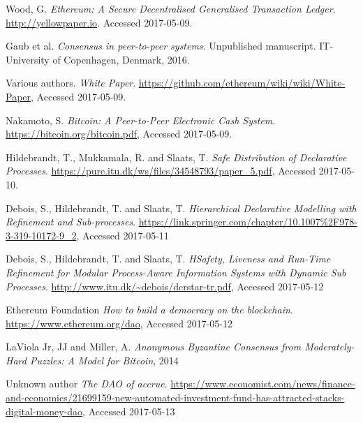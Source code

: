 \documentclass{article}
\begin{document}
	\pagebreak
	
	\begin{thebibliography}{99}

		Wood, G.
		\textit{Ethereum: A Secure Decentralised Generalised Transaction Ledger}. 
		\url{http://yellowpaper.io}.
		Accessed 2017-05-09.

		Gaub et al.
		\textit{Consensus in peer-to-peer systems}.
		Unpublished manuscript.
		IT-University of Copenhagen,
		Denmark,
		2016.

		Various authors.
		\textit{White Paper}.
		\url{https://github.com/ethereum/wiki/wiki/White-Paper},
		Accessed 2017-05-09.

		Nakamoto, S.
		\textit{Bitcoin: A Peer-to-Peer Electronic Cash System}.
		\url{https://bitcoin.org/bitcoin.pdf},
		Accessed 2017-05-09.

		Hildebrandt, T., Mukkamala, R. and Slaats, T.
		\textit{Safe Distribution of Declarative Processes}.
		\url{https://pure.itu.dk/ws/files/34548793/paper_5.pdf},
		Accessed 2017-05-10.

		Debois, S., Hildebrandt, T. and Slaats, T.
		\textit{Hierarchical Declarative Modelling with Refinement and Sub-processes}.
		\url{https://link.springer.com/chapter/10.1007%2F978-3-319-10172-9_2},
		Accessed 2017-05-11

		Debois, S., Hildebrandt, T. and Slaats, T.
		\textit{HSafety, Liveness and Run-Time Refinement for Modular Process-Aware Information Systems with Dynamic Sub Processes}.
		\url{http://www.itu.dk/~debois/dcrstar-tr.pdf},
		Accessed 2017-05-12

		
		Ethereum Foundation
		\textit{How to build a democracy on the blockchain}.
		\url{https://www.ethereum.org/dao},
		Accessed 2017-05-12

		LaViola Jr, JJ and Miller, A.
		\textit{Anonymous Byzantine Consensus from Moderately-Hard Puzzles: A Model for Bitcoin},
		2014

		Unknown author
		\textit{The DAO of accrue}.
		\url{https://www.economist.com/news/finance-and-economics/21699159-new-automated-investment-fund-has-attracted-stacks-digital-money-dao},
		Accessed 2017-05-13

		
		

	\end{thebibliography}
\end{document}
